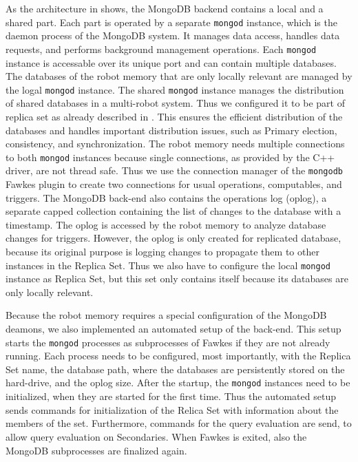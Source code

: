 As the architecture in  shows, the MongoDB backend
contains a local and a shared part. Each part is operated by a
separate \texttt{mongod} instance, which is the daemon process of the
MongoDB system. It manages data access, handles data requests, and
performs background management operations. Each \texttt{mongod}
instance is accessable over its unique port and can contain multiple
databases. The databases of the robot memory that are only locally
relevant are managed by the logal \texttt{mongod} instance. The shared
\texttt{mongod} instance manages the distribution of shared databases
in a multi-robot system. Thus we configured it to be part of replica
set as already described in . This ensures the
efficient distribution of the databases and handles important
distribution issues, such as Primary election, consistency, and
synchronization.    The
robot memory needs multiple connections to both \texttt{mongod}
instances because single connections, as provided by the C++ driver,
are not thread safe. Thus we use the connection manager of the
\texttt{mongodb} Fawkes plugin to create two connections for usual
operations, computables, and triggers.
%
The MongoDB back-end also contains the operations log (oplog), a
separate capped collection containing the list of changes to the
database with a timestamp. The oplog is accessed by the robot memory
to analyze database changes for triggers. However, the oplog is only
created for replicated database, because its original purpose is
logging changes to propagate them to other instances in the Replica
Set. Thus we also have to configure the local \texttt{mongod} instance
as Replica Set, but this set only contains itself because its
databases are only locally relevant.

Because the robot memory requires a special configuration of the
MongoDB deamons, we also implemented an automated setup of the
back-end. This setup starts the \texttt{mongod} processes as
subprocesses of Fawkes if they are not already running. Each process
needs to be configured, most importantly, with the Replica Set name,
the database path, where the databases are persistently stored on the
hard-drive, and the oplog size. After the startup, the \texttt{mongod}
instances need to be initialized, when they are started for the first
time. Thus the automated setup sends commands for initialization of
the Relica Set with information about the members of the
set. Furthermore, commands for the query evaluation are send, to allow
query evaluation on Secondaries.    When Fawkes is exited, also the
MongoDB subprocesses are finalized again.

